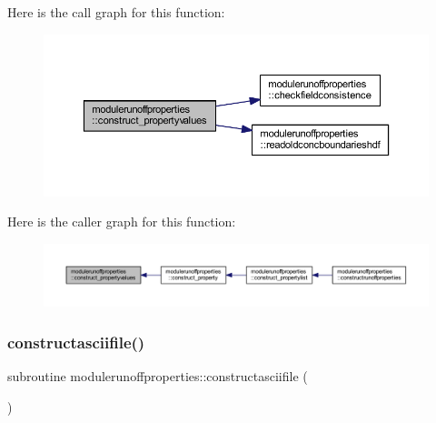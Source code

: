 Here is the call graph for this function\+:\nopagebreak
\begin{figure}[H]
\begin{center}
\leavevmode
\includegraphics[width=350pt]{namespacemodulerunoffproperties_a72bab581ca5f460f8d99af192c79b0ed_cgraph}
\end{center}
\end{figure}
Here is the caller graph for this function\+:\nopagebreak
\begin{figure}[H]
\begin{center}
\leavevmode
\includegraphics[width=350pt]{namespacemodulerunoffproperties_a72bab581ca5f460f8d99af192c79b0ed_icgraph}
\end{center}
\end{figure}
\mbox{\label{namespacemodulerunoffproperties_a45fc4e5579efd1a6fc669b8461d2b427}} 
\subsubsection{\texorpdfstring{constructasciifile()}{constructasciifile()}}
{\footnotesize\ttfamily subroutine modulerunoffproperties\+::constructasciifile (\begin{DoxyParamCaption}{ }\end{DoxyParamCaption})\hspace{0.3cm}{\ttfamily [private]}}

\mbox{\label{namespacemodulerunoffproperties_a3a9583323dea60d8001dd48bf958642e}} 
